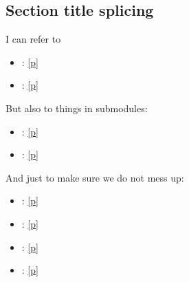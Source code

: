 {\subsection{Section title splicing\label{section-title-splicing}}%
I can refer to

\begin{itemize}\item{ : \hyperref[module-Ocamlary-indexmodules]{[p\pageref*{module-Ocamlary-indexmodules}]}}%
\item{ : \hyperref[module-Ocamlary-aliases]{[p\pageref*{module-Ocamlary-aliases}]}}\end{itemize}%
But also to things in submodules:

\begin{itemize}\item{ : \hyperref[module-Ocamlary-module-type-SuperSig-module-type-SubSigA-subSig]{[p\pageref*{module-Ocamlary-module-type-SuperSig-module-type-SubSigA-subSig}]}}%
\item{ : \hyperref[module-Ocamlary-module-Aliases-incl]{[p\pageref*{module-Ocamlary-module-Aliases-incl}]}}\end{itemize}%
And just to make sure we do not mess up:

\begin{itemize}\item{ : \hyperref[module-Ocamlary-indexmodules]{[p\pageref*{module-Ocamlary-indexmodules}]}}%
\item{ : \hyperref[module-Ocamlary-aliases]{[p\pageref*{module-Ocamlary-aliases}]}}%
\item{ : \hyperref[module-Ocamlary-module-type-SuperSig-module-type-SubSigA-subSig]{[p\pageref*{module-Ocamlary-module-type-SuperSig-module-type-SubSigA-subSig}]}}%
\item{ : \hyperref[module-Ocamlary-module-Aliases-incl]{[p\pageref*{module-Ocamlary-module-Aliases-incl}]}}\end{itemize}%
}
